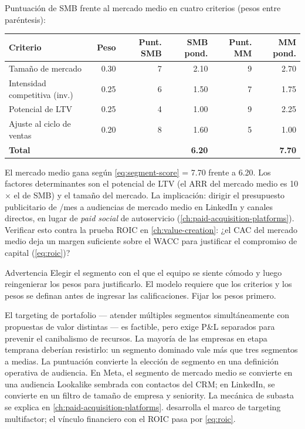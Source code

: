 \begin{example}
Puntuación de SMB frente al mercado medio en cuatro criterios (pesos entre paréntesis):

\medskip
{\small
\begin{tabular}{lrrrrr}
  \toprule
  Criterio & Peso & Punt. SMB & SMB pond. & Punt. MM & MM pond. \\
  \midrule
  Tamaño de mercado              & 0.30 & 7 & 2.10 & 9 & 2.70 \\
  Intensidad competitiva (inv.)  & 0.25 & 6 & 1.50 & 7 & 1.75 \\
  Potencial de LTV               & 0.25 & 4 & 1.00 & 9 & 2.25 \\
  Ajuste al ciclo de ventas      & 0.20 & 8 & 1.60 & 5 & 1.00 \\
  \midrule
  \textbf{Total}                 &      &   & \textbf{6.20} & & \textbf{7.70} \\
  \bottomrule
\end{tabular}}
\medskip

El mercado medio gana según \cref{eq:segment-score} = 7.70 frente a 6.20. Los factores determinantes son el potencial de LTV (el ARR del mercado medio es 10$\times$ el de SMB) y el tamaño del mercado. La implicación: dirigir el presupuesto publicitario de /mes a audiencias de mercado medio en LinkedIn y canales directos, en lugar de \emph{paid social} de autoservicio (\cref{ch:paid-acquisition-platforms}). Verificar esto contra la prueba ROIC en \cref{ch:value-creation}: ¿el CAC del mercado medio deja un margen suficiente sobre el WACC para justificar el compromiso de capital (\cref{eq:roic})?
\end{example}

\begin{admonition}{Advertencia}
Elegir el segmento con el que el equipo se siente cómodo y luego reingenierar los pesos para justificarlo. El modelo requiere que los criterios y los pesos se definan antes de ingresar las calificaciones. Fijar los pesos primero.
\end{admonition}

El targeting de portafolio --- atender múltiples segmentos simultáneamente con propuestas de valor distintas --- es factible, pero exige P\&L separados para prevenir el canibalismo de recursos. La mayoría de las empresas en etapa temprana deberían resistirlo: un segmento dominado vale más que tres segmentos a medias. La puntuación convierte la elección de segmento en una definición operativa de audiencia. En Meta, el segmento de mercado medio se convierte en una audiencia Lookalike sembrada con contactos del CRM; en LinkedIn, se convierte en un filtro de tamaño de empresa y seniority. La mecánica de subasta se explica en \cref{ch:paid-acquisition-platforms}. \textcite{kotler2021} desarrolla el marco de targeting multifactor; el vínculo financiero con el ROIC pasa por \cref{eq:roic}.

